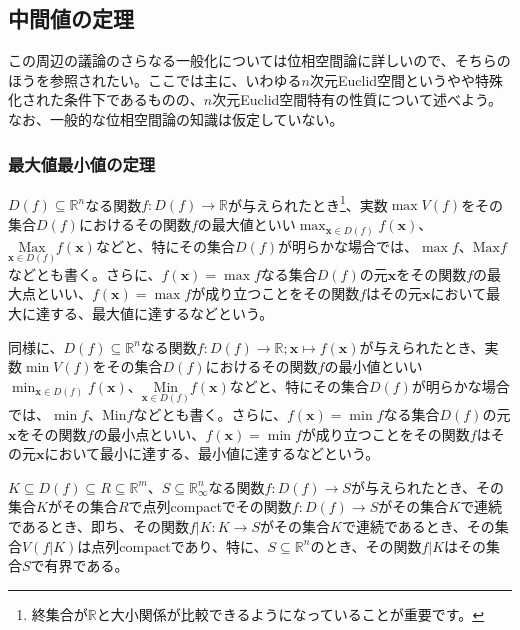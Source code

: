 \documentclass[dvipdfmx]{jsarticle}
\begin{document}
\subsection{中間値の定理}%
この周辺の議論のさらなる一般化については位相空間論に詳しいので、そちらのほうを参照されたい。ここでは主に、いわゆる$n$次元Euclid空間というやや特殊化された条件下であるものの、$n$次元Euclid空間特有の性質について述べよう。なお、一般的な位相空間論の知識は仮定していない。
\subsubsection{最大値最小値の定理}%
\begin{dfn}
$D(f) \subseteq \mathbb{R}^{n}$なる関数$f:D(f) \rightarrow \mathbb{R}$が与えられたとき\footnote{終集合が$\mathbb{R}$と大小関係が比較できるようになっていることが重要です。}、実数$\max{V(f)}$をその集合$D(f)$におけるその関数$f$の最大値といい$\max_{\mathbf{x} \in D(f)}{f\left( \mathbf{x} \right)}$、$\underset{\mathbf{x} \in D(f)}{\mathrm{Max}}{f\left( \mathbf{x} \right)}$などと、特にその集合$D(f)$が明らかな場合では、$\max f$、$\mathrm{Max}f$などとも書く。さらに、$f\left( \mathbf{x} \right) = \max f$なる集合$D(f)$の元$\mathbf{x}$をその関数$f$の最大点といい、$f\left( \mathbf{x} \right) = \max f$が成り立つことをその関数$f$はその元$\mathbf{x}$において最大に達する、最大値に達するなどという。\par
同様に、$D(f) \subseteq \mathbb{R}^{n}$なる関数$f:D(f) \rightarrow \mathbb{R};\mathbf{x} \mapsto f\left( \mathbf{x} \right)$が与えられたとき、実数$\min{V(f)}$をその集合$D(f)$におけるその関数$f$の最小値といい$\min_{\mathbf{x} \in D(f)}{f\left( \mathbf{x} \right)}$、$\underset{\mathbf{x} \in D(f)}{\mathrm{Min}}{f\left( \mathbf{x} \right)}$などと、特にその集合$D(f)$が明らかな場合では、$\min f$、$\mathrm{Min}f$などとも書く。さらに、$f\left( \mathbf{x} \right) = \min f$なる集合$D(f)$の元$\mathbf{x}$をその関数$f$の最小点といい、$f\left( \mathbf{x} \right) = \min f$が成り立つことをその関数$f$はその元$\mathbf{x}$において最小に達する、最小値に達するなどという。
\end{dfn}
\begin{thm}\label{4.1.12.1}
$K \subseteq D(f) \subseteq R \subseteq \mathbb{R}^{m}$、$S \subseteq \mathbb{R}_{\infty}^{n}$なる関数$f:D(f) \rightarrow S$が与えられたとき、その集合$K$がその集合$R$で点列compactでその関数$f:D(f) \rightarrow S$がその集合$K$で連続であるとき、即ち、その関数$f|K:K \rightarrow S$がその集合$K$で連続であるとき、その集合$V\left( f|K \right)$は点列compactであり、特に、$S \subseteq \mathbb{R}^{n}$のとき、その関数$f|K$はその集合$S$で有界である。
\end{thm}\par
\end{document}
